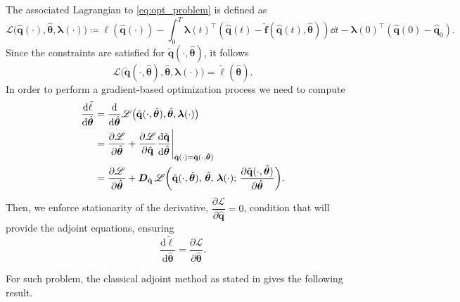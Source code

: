 The associated Lagrangian to \eqref{eq:opt_problem} is defined as\\
\begin{equation}
        \mathscr{L}\bigl(\hat{\mathbf{q}}(\cdot),\hat{\bm{\theta}},\bm{\lambda}(\cdot)\bigr) \coloneqq \ell(\hat{\mathbf{q}}(\cdot)) - \int_0^T \bm{\lambda}(t)^{\top}\left( \dot{\hat{\mathbf{q}}}(t)-\hat{\mathbf{f}}(\hat{\mathbf{q}}(t),\hat{\bm{\theta}}) \right)\dd t - \bm{\lambda}(0)^{\top}(\hat{\mathbf{q}}(0)-\hat{\mathbf{q}}_0).
        \label{eq:lagrange_cost}
    \end{equation}
Since the constraints are satisfied for $\tilde{\mathbf{q}}(\cdot,\hat{\bm{\theta}})$, it follows\\
$$\mathscr{L}\bigl(\tilde{\mathbf{q}}(\cdot,\hat{\bm{\theta}}),\hat{\bm{\theta}}, \bm{\lambda}(\cdot)\bigr) = \tilde{\ell} (\hat{\bm{\theta}}).$$
In order to perform a gradient-based optimization process we need to compute\\
\begin{align*}
    \dv{\tilde{\ell}}{\hat{\bm{\theta}}} &= \dv{}{\hat{\bm{\theta}}} \mathscr{L}\bigl(\tilde{\mathbf{q}}(\cdot,\hat{\bm{\theta}}),\hat{\bm{\theta}},\bm{\lambda}(\cdot)\bigr) \\
    &= \dfrac{\partial\mathscr{L}}{\partial\hat{\bm{\theta}}} + \dfrac{\partial\mathscr{L}}{\partial\hat{\mathbf{q}}} \dfrac{\textrm{d}\tilde{\mathbf{q}}}{\textrm{d}\hat{\bm{\theta}}}\Bigg\vert_{\hat{\mathbf{q}}(\cdot) = \tilde{\mathbf{q}}(\cdot, \hat{\bm{\theta}} ) } \\
    &= 
  \frac{\partial\mathscr{L}}{\partial \hat{\bm{\theta}}}+
  \bm{D}_{\hat{\mathbf{q}}}\,\mathscr{L}\biggl(\tilde{\mathbf{q}}(\cdot,\hat{\bm{\theta}}),\,\hat{\bm{\theta}},\,\bm{\lambda}(\cdot);\,
    \dfrac{\partial\tilde{\mathbf{q}}(\cdot,\hat{\bm{\theta}})}{\partial\hat{\bm{\theta}}}
  \biggr).
\end{align*}
Then, we enforce stationarity of the derivative, $\dfrac{\partial\mathscr{L}}{\partial\hat{\mathbf{q}}} = 0$, condition that will provide the adjoint equations, ensuring\\
\begin{equation}
  \label{eq:equal_grad}
  \frac{\mathrm{d}\tilde{\ell}}{\mathrm{d}\hat{\bm{\theta}}}
  = \frac{\partial\mathscr{L}}{\partial\hat{\bm{\theta}}}.
\end{equation}

For such problem, the classical adjoint method as stated in \cite{bradley2024pde,luchini2024introduction} gives the following result.

